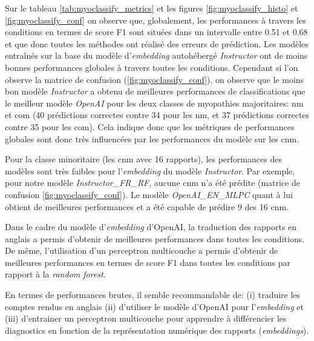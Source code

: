 Sur le tableau \ref{tab:myoclassify_metrics} et les figures \ref{fig:myoclassify_histo} et \ref{fig:myoclassify_conf} on observe que, globalement, les performances à travers les conditions en termes de score F1 sont situées dans un intervalle entre 0.51 et 0.68 et que donc toutes les méthodes ont réalisé des erreurs de prédiction. Les modèles entraînés sur la base du modèle d'\textit{embedding} autohébergé \textit{Instructor} ont de moins bonnes performances globales à travers toutes les conditions. Cependant si l'on observe la matrice de confusion (\ref{fig:myoclassify_conf}), on observe que le moins bon modèle \textit{Instructor} a obtenu de meilleures performances de classifications que le meilleur modèle \textit{OpenAI} pour les deux classes de myopathies majoritaires: \gls{nm} et \gls{com} (40 prédictions correctes contre 34 pour les \gls{nm}, et 37 prédictions correctes contre 35 pour les \gls{com}). Cela indique donc que les métriques de performances globales sont donc très influencées par les performances du modèle sur les \gls{cnm}.

Pour la classe minoritaire (les \gls{cnm} avec 16 rapports), les performances des modèles sont très faibles pour l'\textit{embedding} du modèle \textit{Instructor}. Par exemple, pour notre modèle \textit{Instructor\_FR\_RF}, aucune \gls{cnm} n'a été prédite (matrice de confusion \ref{fig:myoclassify_conf}). Le modèle \textit{OpenAI\_EN\_MLPC} quant à lui obtient de meilleures performances et a été capable de prédire 9 des 16 \gls{cnm}. 

Dans le cadre du modèle d'\textit{embedding} d'OpenAI, la traduction des rapports en anglais a permis d'obtenir de meilleures performances dans toutes les conditions. De même, l'utilisation d'un perceptron multicouche a permis d'obtenir de meilleures performances en termes de score F1 dans toutes les conditions par rapport à la \textit{random forest}.

En termes de performances brutes, il semble recommandable de: (i) traduire les comptes rendus en anglais (ii) d'utiliser le modèle d'OpenAI pour l'\textit{embedding} et (iii) d'entrainer un perceptron multicouche pour apprendre à différencier les diagnostics en fonction de la représentation numérique des rapports (\textit{embeddings}).

